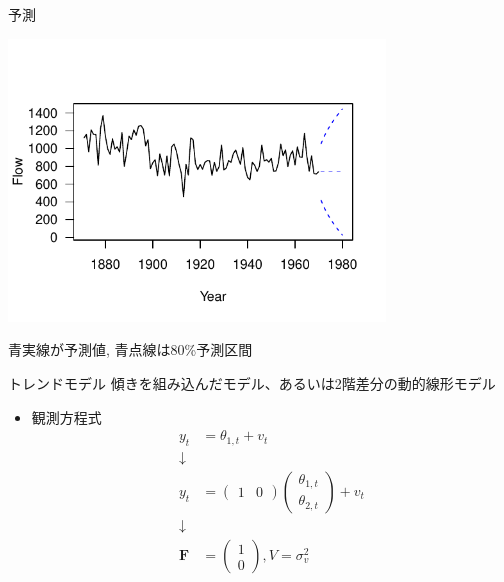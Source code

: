 \documentclass[dvipdfmx,12pt]{beamer}
\begin{document}
\begin{frame}{予測}
  \begin{center}
    \includegraphics[width=10cm]{dlm1_predict}
  \end{center}

  青実線が予測値, 青点線は80\%予測区間
\end{frame}



\begin{frame}{トレンドモデル}
  傾きを組み込んだモデル、あるいは2階差分の動的線形モデル

  \begin{itemize}
  \item 観測方程式
    \begin{align*}
      y_{t} &= \theta_{1,t} + v_{t} \\
      \downarrow \\
      y_{t} &= \left(\begin{array}{cc}1 & 0\end{array}\right)
        \left(\begin{array}{c}\theta_{1,t} \\ \theta_{2,t} \end{array}\right) + v_{t} \\
        \downarrow \\
        \boldsymbol{F} &= \left(\begin{array}{c}1 \\ 0\end{array}\right),
          V = \sigma_{v}^2 
    \end{align*}
  \end{itemize}
\end{frame}
\end{document}
